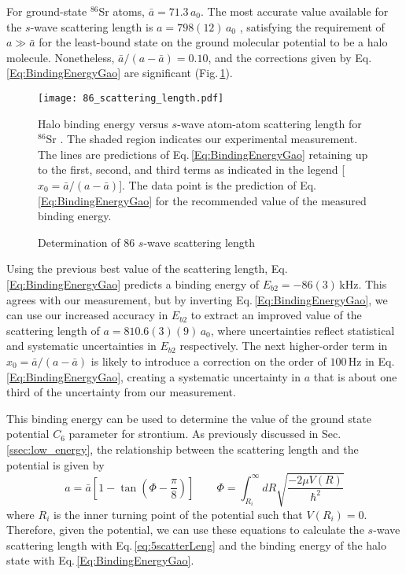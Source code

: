 For ground-state $^{86}$Sr atoms, $\bar{a}=71.3$\,$a_0$.
The most accurate value available for the $s$-wave scattering length is $a=798 (12)$\,$a_0$ \cite{Stein2010}, satisfying the requirement of $a\gg \bar{a}$ for the least-bound state on the ground molecular potential to be a halo molecule.
Nonetheless, ${\bar{a}}/({a-\bar{a}})=0.10$, and the corrections given by Eq.\,\ref{Eq:BindingEnergyGao} are significant (Fig.\,\ref{fig:HaloBindingEnergy}).
	\begin{figure} 
	\centerline{
	  \texttt{[image: 86\_scattering\_length.pdf]}}
	  \caption{Determination of 86 $s$-wave scattering length}{Halo binding energy versus $s$-wave atom-atom scattering length for $^{86}$Sr . The shaded region indicates our experimental measurement. The lines are predictions of Eq.\,\ref{Eq:BindingEnergyGao} retaining up to the first, second, and third terms as indicated in the legend [$x_0={\bar{a}}/({a-\bar{a}})$]. The data point is the prediction of Eq.\,\ref{Eq:BindingEnergyGao} for the recommended value of the measured binding energy.}
	  \label{fig:HaloBindingEnergy}
	\end{figure}
Using the previous best value of the scattering length, Eq.\,\ref{Eq:BindingEnergyGao} predicts a binding energy of $E_{b2}=-86(3)$\,kHz.
This agrees with our measurement, but by inverting Eq.\,\ref{Eq:BindingEnergyGao}, we can use our increased accuracy in $E_{b2}$ to extract an improved value of the scattering length of $a=810.6(3)(9)$\,$a_0$, where uncertainties reflect statistical and systematic uncertainties in $E_{b2}$ respectively.
The next higher-order term in $x_0={\bar{a}}/({a-\bar{a}})$ is likely to introduce a correction on the order of $100$\,Hz in Eq.\,\ref{Eq:BindingEnergyGao}, creating a systematic uncertainty in $a$ that is about one third of the uncertainty from our measurement.

This binding energy can be used to determine the value of the ground state potential $C_6$ parameter for strontium.
As previously discussed in Sec.\,\ref{ssec:low_energy}, the relationship between the scattering length and the potential is given by
\begin{equation} \label{eq:5scatterLeng}
	a = \bar{a} \left[ 1 - \tan(\Phi - \frac{\pi}{8}) \right] \quad \quad \Phi = \int_{R_i}^{\infty} dR \sqrt{\frac{-2\mu V(R)}{\hbar^2}}
\end{equation} 
where $R_i$ is the inner turning point of the potential such that $V(R_i)=0$.
Therefore, given the potential, we can use these equations to calculate the $s$-wave scattering length with Eq.\,\ref{eq:5scatterLeng} and the binding energy of the halo state with Eq.\,\ref{Eq:BindingEnergyGao}.


